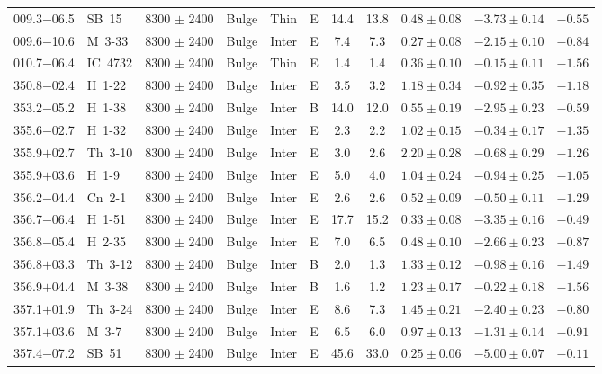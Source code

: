 \documentclass[useAMS]{mn2e}
\begin{document}
\begin{center}
{\begin{longtable}{llccccccccc}
009.3$-$06.5		&	SB~15	&	8300 $\pm$ 2400		&	Bulge		&	Thin		&	E		&	14.4		&	13.8		&	$0.48 \pm 0.08$		&	$-3.73 \pm 0.14$		&	$-0.55$	\\
009.6$-$10.6		&	M~3-33	&	8300 $\pm$ 2400		&	Bulge		&	Inter		&	E		&	7.4		&	7.3		&	$0.27 \pm 0.08$		&	$-2.15 \pm 0.10$		&	$-0.84$	\\
010.7$-$06.4		&	IC~4732	&	8300 $\pm$ 2400		&	Bulge		&	Thin		&	E		&	1.4		&	1.4		&	$0.36 \pm 0.10$		&	$-0.15 \pm 0.11$		&	$-1.56$	\\
350.8$-$02.4		&	H~1-22	&	8300 $\pm$ 2400		&	Bulge		&	Inter		&	E		&	3.5		&	3.2		&	$1.18 \pm 0.34$		&	$-0.92 \pm 0.35$		&	$-1.18$	\\
353.2$-$05.2		&	H~1-38	&	8300 $\pm$ 2400		&	Bulge		&	Inter		&	B		&	14.0		&	12.0		&	$0.55 \pm 0.19$		&	$-2.95 \pm 0.23$		&	$-0.59$	\\
355.6$-$02.7		&	H~1-32	&	8300 $\pm$ 2400		&	Bulge		&	Inter		&	E		&	2.3		&	2.2		&	$1.02 \pm 0.15$		&	$-0.34 \pm 0.17$		&	$-1.35$	\\
355.9$+$02.7		&	Th~3-10	&	8300 $\pm$ 2400		&	Bulge		&	Inter		&	E		&	3.0		&	2.6		&	$2.20 \pm 0.28$		&	$-0.68 \pm 0.29$		&	$-1.26$	\\
355.9$+$03.6		&	H~1-9	&	8300 $\pm$ 2400		&	Bulge		&	Inter		&	E		&	5.0		&	4.0		&	$1.04 \pm 0.24$		&	$-0.94 \pm 0.25$		&	$-1.05$	\\
356.2$-$04.4		&	Cn~2-1	&	8300 $\pm$ 2400		&	Bulge		&	Inter		&	E		&	2.6		&	2.6		&	$0.52 \pm 0.09$		&	$-0.50 \pm 0.11$		&	$-1.29$	\\
356.7$-$06.4		&	H~1-51	&	8300 $\pm$ 2400		&	Bulge		&	Inter		&	E		&	17.7		&	15.2		&	$0.33 \pm 0.08$		&	$-3.35 \pm 0.16$		&	$-0.49$	\\
356.8$-$05.4		&	H~2-35	&	8300 $\pm$ 2400		&	Bulge		&	Inter		&	E		&	7.0		&	6.5		&	$0.48 \pm 0.10$		&	$-2.66 \pm 0.23$		&	$-0.87$	\\
356.8$+$03.3		&	Th~3-12	&	8300 $\pm$ 2400		&	Bulge		&	Inter		&	B		&	2.0		&	1.3		&	$1.33 \pm 0.12$		&	$-0.98 \pm 0.16$		&	$-1.49$	\\
356.9$+$04.4		&	M~3-38	&	8300 $\pm$ 2400		&	Bulge		&	Inter		&	B		&	1.6		&	1.2		&	$1.23 \pm 0.17$		&	$-0.22 \pm 0.18$		&	$-1.56$	\\
357.1$+$01.9		&	Th~3-24	&	8300 $\pm$ 2400		&	Bulge		&	Inter		&	E		&	8.6		&	7.3		&	$1.45 \pm 0.21$		&	$-2.40 \pm 0.23$		&	$-0.80$	\\
357.1$+$03.6		&	M~3-7	&	8300 $\pm$ 2400		&	Bulge		&	Inter		&	E		&	6.5		&	6.0		&	$0.97 \pm 0.13$		&	$-1.31 \pm 0.14$		&	$-0.91$	\\
357.4$-$07.2		&	SB~51	&	8300 $\pm$ 2400		&	Bulge		&	Inter		&	E		&	45.6		&	33.0		&	$0.25 \pm 0.06$		&	$-5.00 \pm 0.07$		&	$-0.11$	\\

\end{longtable}}
\end{center}
\end{document}
